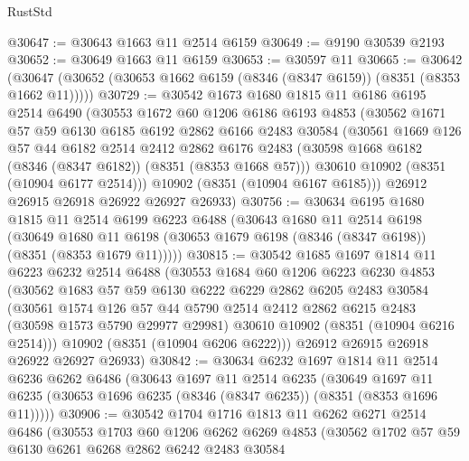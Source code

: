 \begin{lexlean}{RustStd}
\begin{coremodule}
@30647 := @30643 @1663 @11 @2514 @6159
@30649 := @9190 @30539 @2193
@30652 := @30649 @1663 @11 @6159
@30653 := @30597 @11
@30665 := @30642
    (@30647 (@30652 (@30653 @1662 @6159 (@8346 (@8347 @6159)) (@8351 (@8353 @1662 @11)))))
@30729 := @30542
    @1673
    @1680
    @1815
    @11
    @6186
    @6195
    @2514
    @6490
    (@30553
      @1672
      @60
      @1206
      @6186
      @6193
      @4853
      (@30562
        @1671
        @57
        @59
        @6130
        @6185
        @6192
        @2862
        @6166
        @2483
        @30584
        (@30561
          @1669
          @126
          @57
          @44
          @6182
          @2514
          @2412
          @2862
          @6176
          @2483
          (@30598 @1668 @6182 (@8346 (@8347 @6182)) (@8351 (@8353 @1668 @57)))
          @30610
          @10902
          (@8351 (@10904 @6177 @2514)))
        @10902
        (@8351 (@10904 @6167 @6185)))
      @26912
      @26915
      @26918
      @26922
      @26927
      @26933)
@30756 := @30634
    @6195
    @1680
    @1815
    @11
    @2514
    @6199
    @6223
    @6488
    (@30643
      @1680
      @11
      @2514
      @6198
      (@30649 @1680 @11 @6198 (@30653 @1679 @6198 (@8346 (@8347 @6198)) (@8351 (@8353 @1679 @11)))))
@30815 := @30542
    @1685
    @1697
    @1814
    @11
    @6223
    @6232
    @2514
    @6488
    (@30553
      @1684
      @60
      @1206
      @6223
      @6230
      @4853
      (@30562
        @1683
        @57
        @59
        @6130
        @6222
        @6229
        @2862
        @6205
        @2483
        @30584
        (@30561
          @1574
          @126
          @57
          @44
          @5790
          @2514
          @2412
          @2862
          @6215
          @2483
          (@30598 @1573 @5790 @29977 @29981)
          @30610
          @10902
          (@8351 (@10904 @6216 @2514)))
        @10902
        (@8351 (@10904 @6206 @6222)))
      @26912
      @26915
      @26918
      @26922
      @26927
      @26933)
@30842 := @30634
    @6232
    @1697
    @1814
    @11
    @2514
    @6236
    @6262
    @6486
    (@30643
      @1697
      @11
      @2514
      @6235
      (@30649 @1697 @11 @6235 (@30653 @1696 @6235 (@8346 (@8347 @6235)) (@8351 (@8353 @1696 @11)))))
@30906 := @30542
    @1704
    @1716
    @1813
    @11
    @6262
    @6271
    @2514
    @6486
    (@30553
      @1703
      @60
      @1206
      @6262
      @6269
      @4853
      (@30562
        @1702
        @57
        @59
        @6130
        @6261
        @6268
        @2862
        @6242
        @2483
        @30584

\end{coremodule}
\end{lexlean}

